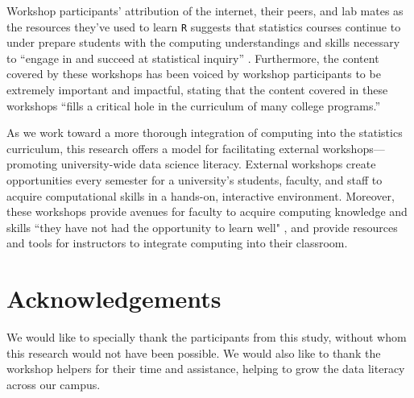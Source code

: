 \documentclass[12pt]{article}
\begin{document}
\quad Workshop participants' attribution of the internet, their peers, and lab mates as the resources they've used to learn \texttt{R} suggests that statistics courses continue to under prepare students with the computing understandings and skills necessary to ``engage in and succeed at statistical inquiry'' \citep[p. 97]{nolan}. Furthermore, the content covered by these workshops has been voiced by workshop participants to be extremely important and impactful, stating that the content covered in these workshops ``fills a critical hole in the curriculum of many college programs.'' 

\quad As we work toward a more thorough integration of computing into the statistics curriculum, this research offers a model for facilitating external workshops---promoting university-wide data science literacy. External workshops create opportunities every semester for a university's students, faculty, and staff to acquire computational skills in a hands-on, interactive environment. Moreover, these workshops provide avenues for faculty to acquire computing knowledge and skills ``they have not had the opportunity to learn well" \citep[p. 106]{nolan}, and provide resources and tools for instructors to integrate computing into their classroom.

\section{Acknowledgements}

We would like to specially thank the participants from this study, without whom
this research would not have been possible. We would also like to thank the
workshop helpers for their time and assistance, helping to grow the data
literacy across our campus. 




\end{document}

